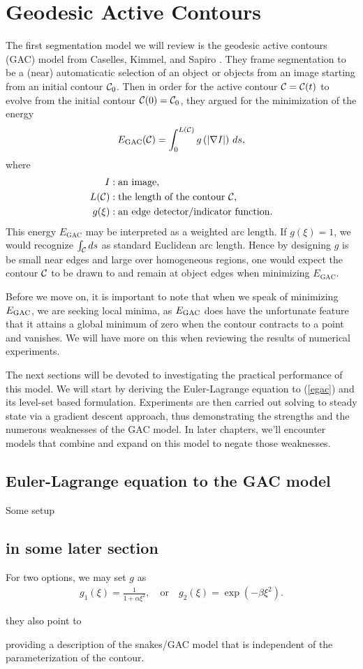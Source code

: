 \chapter{Geodesic Active Contours}
The first segmentation model we will review is the geodesic active contours (GAC) model from Caselles, Kimmel, and Sapiro \cite{caselles1997geodesic}. They frame segmentation to be a (near) automaticatic selection of an object or objects from an image starting from an initial contour $\mathcal{C}_0$. Then in order for the active contour $\mathcal{C} = \mathcal{C}(t)$ to evolve from the initial contour $\mathcal{C}(0) = \mathcal{C}_0$, they argued for the minimization of the energy 
\begin{align}
E_\mathrm{GAC}(\mathcal{C}) = \int^{L(\mathcal{C})}_0 g\left( \left|\nabla I \right| \right) \, ds,
\label{egac}
\end{align}
where 
\begin{align*}
I&: \textrm{an image},
\\
L(\mathcal{C}) &: \textrm{the length of the contour $\mathcal{C}$,} 
\\ 
g(\xi)&: \textrm{an edge detector/indicator function}.
\end{align*}
This energy $E_\textrm{GAC}$ may be interpreted as a weighted arc length. If $g(\xi) = 1$, we would recognize $\int_{\mathcal{C}}  ds$ as standard Euclidean arc length. Hence by designing $g$ is be small near edges and large over homogeneous regions, one would expect the contour $\mathcal{C}$ to be drawn to and remain at object edges when minimizing $E_\textrm{GAC}$. 

Before we move on, it is important to note that when we speak of minimizing $E_\textrm{GAC}$, we are seeking local minima, as $E_\textrm{GAC}$ does have the unfortunate feature that it attains a global minimum of zero when the contour contracts to a point and vanishes. We will have more on this when reviewing the results of numerical experiments.

The next sections will be devoted to investigating the practical performance of this model. We will start by deriving the Euler-Lagrange equation to (\ref{egac}) and its level-set based formulation. Experiments are then carried out solving to steady state via a gradient descent approach, thus demonstrating the strengths and the numerous weaknesses of the GAC model. In later chapters, we'll encounter models that combine and expand on this model to negate those weaknesses.


\section{Euler-Lagrange equation to the GAC model}
Some setup



\section{in some later section} 
For two options, we may set $g$ as
\begin{align*}
g_1(\xi) 
= \frac{1}{1 + \alpha\xi^2},
\quad\text{or}\quad 
g_2(\xi) 
= \exp(-\beta\xi^2).
\end{align*}


they also point to 

providing a description of the snakes/GAC model that is independent of the parameterization of the contour.